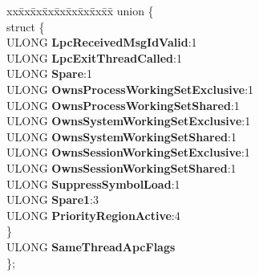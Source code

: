 \begin{DoxyCompactItemize}
\begin{tabbing}
\end{tabbing}\item 
\mbox{\label{struct___e_t_h_r_e_a_d_a10edf0768838b494428d93a25446ce4b}} 
\begin{tabbing}
xx\=xx\=xx\=xx\=xx\=xx\=xx\=xx\=xx\=\kill
union \{\\
\mbox{\label{union___e_t_h_r_e_a_d_1_1_0D2219_a5789c73602493669f0c508ebe36007a5}} 
\>struct \{\\
\>\>ULONG {\bfseries LpcReceivedMsgIdValid}:1\\
\>\>ULONG {\bfseries LpcExitThreadCalled}:1\\
\>\>ULONG {\bfseries Spare}:1\\
\>\>ULONG {\bfseries OwnsProcessWorkingSetExclusive}:1\\
\>\>ULONG {\bfseries OwnsProcessWorkingSetShared}:1\\
\>\>ULONG {\bfseries OwnsSystemWorkingSetExclusive}:1\\
\>\>ULONG {\bfseries OwnsSystemWorkingSetShared}:1\\
\>\>ULONG {\bfseries OwnsSessionWorkingSetExclusive}:1\\
\>\>ULONG {\bfseries OwnsSessionWorkingSetShared}:1\\
\>\>ULONG {\bfseries SuppressSymbolLoad}:1\\
\>\>ULONG {\bfseries Spare1}:3\\
\>\>ULONG {\bfseries PriorityRegionActive}:4\\
\>\} \\
\>ULONG {\bfseries SameThreadApcFlags}\\
\}; \\


\end{tabbing}
\end{DoxyCompactItemize}
